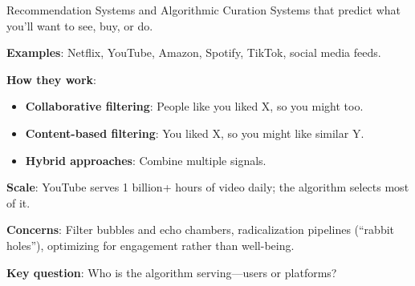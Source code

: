 \documentclass[aspectratio=169,11pt]{beamer}
\begin{document}
\begin{frame}{Recommendation Systems and Algorithmic Curation}
Systems that predict what you'll want to see, buy, or do.

\vspace{0.2em}
\textbf{Examples}: Netflix, YouTube, Amazon, Spotify, TikTok, social media feeds.

\vspace{0.2em}
\textbf{How they work}:
\begin{itemize}
    \item \textbf{Collaborative filtering}: People like you liked X, so you might too.
    \item \textbf{Content-based filtering}: You liked X, so you might like similar Y.
    \item \textbf{Hybrid approaches}: Combine multiple signals.
\end{itemize}

\vspace{0.2em}
\textbf{Scale}: YouTube serves 1 billion+ hours of video daily; the algorithm selects most of it.

\vspace{0.2em}
\textbf{Concerns}: Filter bubbles and echo chambers, radicalization pipelines (``rabbit holes''), optimizing for engagement rather than well-being.

\vspace{0.2em}
\textbf{Key question}: Who is the algorithm serving---users or platforms?
\end{frame}
\end{document}
